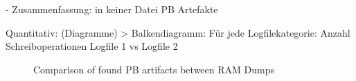 - Zusammenfassung: in keiner Datei PB Artefakte

Quantitativ: (Diagramme)		
	> Balkendiagramm: Für jede Logfilekategorie: Anzahl Schreiboperationen Logfile 1 vs Logfile 2
	\begin{figure}[h!]
		\centerline{}
		\label{chart:final-criteria}  
		\caption{Comparison of found PB artifacts between RAM Dumps}
	\end{figure}



